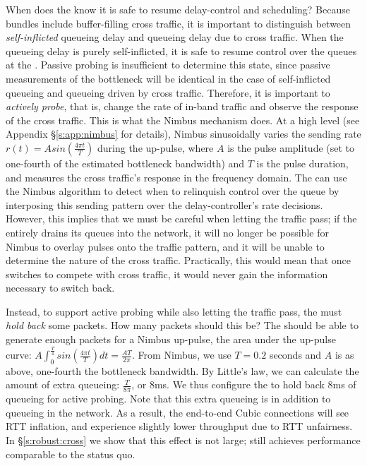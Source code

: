 
When does the \inbox know it is safe to resume delay-control and scheduling?
Because bundles include buffer-filling cross traffic, it is important to distinguish between \emph{self-inflicted} queueing delay and queueing delay due to cross traffic.
When the queueing delay is purely self-inflicted, it is safe to resume control over the queues at the \inbox.
Passive probing is insufficient to determine this state, since passive measurements of the bottleneck will be identical in the case of self-inflicted queueing and queueing driven by cross traffic.
Therefore, it is important to \emph{actively probe}, that is, change the rate of in-band traffic and observe the response of the cross traffic. 
This is what the Nimbus mechanism does.
At a high level (see Appendix \S\ref{s:app:nimbus} for details),
Nimbus sinusoidally varies the sending rate $r(t) = A sin(\frac{4\pi{}t}{T})$ during the up-pulse, where $A$ is the pulse amplitude (set to one-fourth of the estimated bottleneck bandwidth) and $T$ is the pulse duration, and measures the cross traffic's response in the frequency domain.
The \inbox can use the Nimbus algorithm to detect when to relinquish control over the queue by interposing this sending pattern over the delay-controller's rate decisions.
However, this implies that we must be careful when letting the traffic pass; if the \inbox entirely drains its queues into the network, it will no longer be possible for Nimbus to overlay pulses onto the traffic pattern, and it will be unable to determine the nature of the cross traffic.
Practically, this would mean that once \inbox switches to compete with cross traffic, it would never gain the information necessary to switch back.

Instead, to support active probing while also letting the traffic pass, the \inbox must \emph{hold back} some packets.
How many packets should this be? The \inbox should be able to generate enough packets for a Nimbus up-pulse, \ie the area under the up-pulse curve: 
$A \int_0^{\frac{T}{4}} sin(\frac{4\pi{}t}{T}) dt = \frac{AT}{2\pi}$.
From Nimbus, we use $T = 0.2$ seconds and $A$ is as above, one-fourth the bottleneck bandwidth. By Little's law, we can calculate the amount of extra queueing: $\frac{T}{8\pi}$, or $8$ms.
We thus configure the \inbox to hold back $8$ms of queueing for active probing.
Note that this extra queueing is in addition to queueing in the network. As a result, the end-to-end Cubic connections will see RTT inflation, and experience slightly lower throughput due to RTT unfairness. 
In \S\ref{s:robust:cross} we show that this effect is not large; \name still achieves performance comparable to the status quo.

